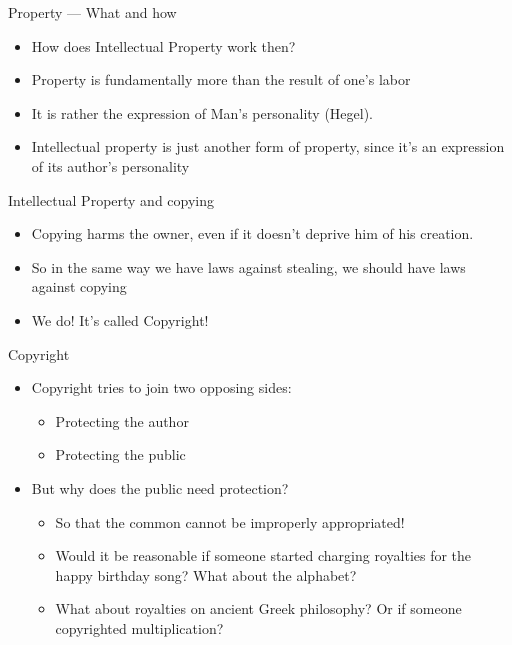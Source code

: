 \documentclass{beamer}
\begin{document}
\begin{frame}{Property --- What and how}
    \begin{itemize}
        \item How does Intellectual Property work then?\pause{}
        \item Property is fundamentally more than the result of one's labor\pause{}
        \item It is rather the expression of Man's personality (Hegel).\pause{}
        \item Intellectual property is just another form of property, since it's an expression of its author's personality
    \end{itemize}
\end{frame}

\begin{frame}{Intellectual Property and copying}
    \begin{itemize}
        \item Copying harms the owner, even if it doesn't deprive him of his creation.\pause{}
        \item So in the same way we have laws against stealing, we should have laws against copying\pause{}
        \item We do! It's called Copyright!
    \end{itemize}
\end{frame}

\begin{frame}{Copyright}
    \begin{itemize}
        \item Copyright tries to join two opposing sides:\pause{}
        \begin{itemize}
            \item Protecting the author\pause{}
            \item Protecting the public\pause{}
        \end{itemize}
        \item But why does the public need protection?\pause{}
        \begin{itemize}
            \item So that the common cannot be improperly appropriated!\pause{}
            \item Would it be reasonable if someone started charging royalties for the happy birthday song? What about the alphabet?\pause{}
            \item What about royalties on ancient Greek philosophy? Or if someone copyrighted multiplication?\pause{}
        \end{itemize}
    \end{itemize}
\end{frame}
\end{document}
